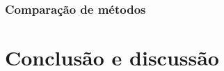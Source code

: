 \documentclass[10pt, conference, compsocconf]{IEEEtran}
\begin{document}
\subsubsection{Comparação de métodos}

\lipsum[5]


\section{Conclusão e discussão}
\label{sec:cnd}

\lipsum[4]
\cite{boser1992training}

\small
\begin{spacing}{0.92}


\end{spacing}
\end{document}
